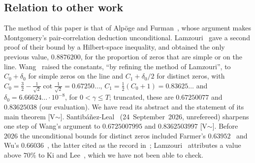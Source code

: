 \subsection{Relation to other work}\label{ssec:others}
The method of this paper is that of Alp\"oge and Furman~\cite{AF}, whose argument makes Montgomery's pair-correlation deduction unconditional.
Lamzouri~\cite{Lamzouri} gave a second proof of their bound by a Hilbert-space inequality, and obtained the only previous value, $0.8876200$, for
the proportion of zeros that are simple or on the line. Wang~\cite{Wang24167} raised the constants, ``by refining the method of Lamzouri'', to
$C_0+\delta_0$ for simple zeros on the line and $C_1+\delta_0/2$ for distinct zeros, with $C_0=\frac32-\frac1{\sqrt2}\cot\frac1{\sqrt2}=0.67250\ldots$,
$C_1=\frac12(C_0+1)=0.83625\ldots$ and $\delta_0=6.66624\ldots\cdot10^{-8}$, for $0<\gamma\le T$; truncated, these are $0.67250077$ and
$0.83625038$ (our evaluation). We have read its abstract and the statement of its main theorem [V$\sim$].
Santib\'a\~nez-Leal~\cite{SantibanezLeal} (24~September~2026, unrefereed) sharpens one step of Wang's argument to $0.6725007995$ and
$0.8362503997$ [V$\sim$]. Before 2026 the unconditional bounds for distinct zeros included Farmer's
$0.63952$~\cite{Farmer95} and Wu's $0.66036$~\cite{Wu12}, the latter cited as the record in~\cite{AF}; Lamzouri~\cite{Lamzouri} attributes a
value above $70\%$ to Ki and Lee~\cite{KiLee12}, which we have not been able to check.


